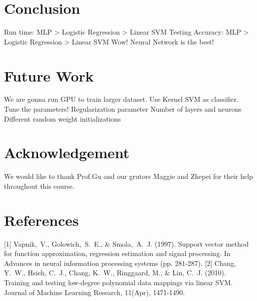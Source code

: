 \documentclass{article}
\begin{document}
\section{Conclusion}
Run time:  MLP > Logistic Regression > Linear SVM
Testing Accuracy: MLP > Logistic Regression > Linear SVM
Wow! Neural Network is the best!

\section{Future Work}
We are gonna run GPU to train larger dataset.
Use Kernel SVM as classifier.
Tune the parameters!
Regularization parameter
Number of layers and neurons
Different random weight initializations 

\section*{Acknowledgement}
We would like to thank Prof.Gu and our grutors Maggie and Zhepei for their help throughout this course.

\section*{References}
\small
[1] Vapnik,\ V., Golowich,\ S.\ E., \& Smola,\ A.\ J. (1997). Support vector method for function approximation, regression estimation and signal processing. In Advances in neural information processing systems (pp. 281-287).
[2] Chang, Y.\ W., Hsieh, C.\ J., Chang, K.\ W., Ringgaard, M., \& Lin, C.\ J. (2010). Training and testing low-degree polynomial data mappings via linear SVM. Journal of Machine Learning Research, 11(Apr), 1471-1490.
\end{document}
